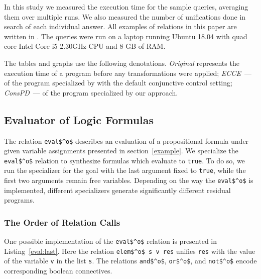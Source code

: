 In this study we measured the execution time for the sample queries, averaging them over multiple runs.
We also measured the number of unifications done in search of each individual answer.
All examples of \mk relations in this paper are written in \oc.
The queries were run on a laptop running Ubuntu 18.04 with quad core Intel Core i5 2.30GHz CPU and 8 GB of RAM.

The tables and graphs use the following denotations.
\emph{Original} represents the execution time of a program before any transformations were applied; \emph{ECCE}~--- of the program specialized by \ecce with the default conjunctive control setting; \emph{ConsPD}~--- of the program specialized by our approach.

\subsection{Evaluator of Logic Formulas}

The relation \lstinline{eval$^o$} describes an evaluation of a propositional formula under given variable assignments presented in section~\ref{example}.
We specialize the \lstinline{eval$^o$} relation to synthesize formulas which evaluate to \lstinline{true}.
To do so, we run the specializer for the goal with the last argument fixed to \lstinline{true}, while the first two arguments remain free variables.
Depending on the way the \lstinline{eval$^o$} is implemented, different specializers generate significantly different residual programs.

\subsubsection{The Order of Relation Calls}

One possible implementation of the \lstinline{eval$^o$} relation is presented in Listing~\ref{eval:last}.
Here the relation \lstinline{elem$^o$ s v res} unifies \lstinline{res} with the value of the variable \lstinline{v} in the list \lstinline{s}.
The relations \lstinline{and$^o$}, \lstinline{or$^o$}, and \lstinline{not$^o$} encode corresponding boolean connectives.

